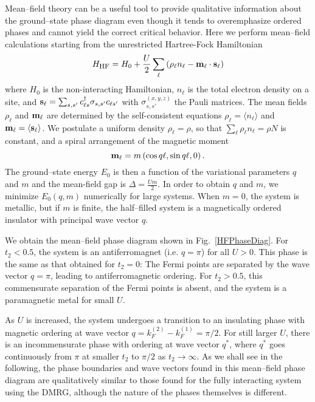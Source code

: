 Mean--field theory can be a useful tool to provide qualitative
information about the ground--state phase diagram even though it 
tends to overemphasize ordered phases and cannot yield the correct
critical behavior.
Here we perform mean--field calculations starting from
the unrestricted Hartree-Fock Hamiltonian
\begin{equation}
 H_{\mbox{\footnotesize HF}} = 
H_0 + \frac{U}{2}\sum_\ell \left( \rho_\ell n_\ell - 
         {\bf m}_\ell \cdot {\bf s}_\ell  \right) 
\end{equation}
where $H_0$ is the non-interacting Hamiltonian, $n_\ell$ is the total
electron density on a site, 
and ${\bf s}_\ell = \sum_{s,s'} c_{\ell s}^\dag {\bf\sigma}_{s,s'}
c_{\ell s'}$ 
with $\sigma^{(x,y,z)}_{s,s'}$ the Pauli matrices.
The mean fields $ \rho_\ell$ and ${\bf m}_\ell $ are determined by the
self-consistent equations
$\rho_\ell = \langle n_\ell \rangle$ and 
${\bf m}_\ell = \langle {\bf s}_\ell  \rangle$.
We postulate a uniform density $\rho_\ell = \rho$, so that 
$\sum_\ell \rho_\ell n_\ell = \rho N$ is constant, and a spiral
arrangement of the magnetic moment
\begin{equation}
     {\bf m}_\ell = m \left(  \cos q\ell, \sin q\ell, 0  \right).
\end{equation}
%
The ground--state energy $E_0$ is then a function of the variational 
parameters $q$ and $m$ and the mean-field gap  is $\Delta = \frac{Um}{2}$. 
In order to obtain $q$ and $m$, we minimize $E_0(q,m)$ numerically for
large systems.
When $m=0$, the system is metallic, but
if $m$ is finite, the half--filled system is a magnetically ordered
insulator with principal wave vector $q$. 

We obtain the mean--field phase diagram shown in Fig.\ \ref{HFPhaseDiag}.
For $t_2<0.5$, the system is an antiferromagnet (i.e. $q=\pi$) for
all $U>0$.
This phase is the same as that obtained for $t_2=0$: 
The Fermi points are separated by the wave vector
$q=\pi$, leading to antiferromagnetic ordering.
For $t_2>0.5$, this commensurate separation of the Fermi points is
absent, and the system is a paramagnetic metal for small $U$.

As $U$ is increased, the system undergoes a transition to an
insulating phase with magnetic ordering at wave vector 
$q=k_F^{(2)} -k_F^{(1)}= \pi/2$. 
For still larger $U$, there is an incommensurate phase
with ordering at wave vector $q^\ast$, where 
$q^\ast$ goes continuously from $\pi$ at smaller $t_2$ to $\pi/2$ as
$t_2\rightarrow \infty$. 
As we shall see in the following, the phase boundaries and wave
vectors found in this mean--field phase diagram are qualitatively
similar to those found for the fully interacting system using the
DMRG, although the nature of the phases themselves is different.

